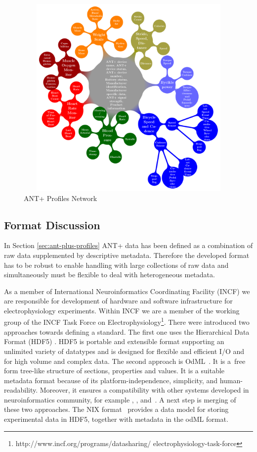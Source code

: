 \documentclass[conference]{IEEEconf}
\begin{document}
\begin{figure}
\centering\includegraphics[width=12cm, height=10cm]{AntPlusProfiles}
\caption{\label{AntPlus}ANT+ Profiles Network}
\end{figure}

\subsection{Format Discussion}

In Section \ref{sec:ant-plus-profiles} ANT+ data has been defined as a combination of raw data supplemented by descriptive metadata. Therefore the developed format has to be robust to enable handling with large collections of raw data and simultaneously must be flexible to deal with heterogeneous metadata.

As a member of International Neuroinformatics Coordinating Facility (INCF) \cite{wvangeit:Bjaalie:JNeurosci:2007} we are responsible for development of hardware and software infrastructure for electrophysiology experiments. Within INCF we are a member of the working group of the INCF Task Force on Electrophysiology\footnote{http://www.incf.org/programs/datasharing/ electrophysiology-task-force}. There were introduced two approaches towards defining a standard. The first one uses the Hierarchical Data Format (HDF5) \cite{hdf5}. HDF5 is portable and extensible format supporting an unlimited variety of datatypes and is designed for flexible and efficient I/O and for high volume and complex data. The second approach is OdML~\cite{10.3389/fninf.2011.00016}. It is a~free form tree-like structure of sections, properties and values. It is a suitable metadata format because of its platform-independence, simplicity, and human-readability. Moreover, it ensures a compatibility with other systems developed in neuroinformatics community, for example \cite{10.3389/conf.fninf.2014.18.00029}, \cite{10.3389/conf.fninf.2014.18.00053}, and~\cite{10.3389/conf.fninf.2013.09.00025}. A next step is merging of these two approaches\cite{10.3389/conf.fninf.2013.09.00069}. The NIX format~\cite{Stoewer:2014} provides a data model for storing experimental data in HDF5, together with metadata in the odML format.
\end{document}
